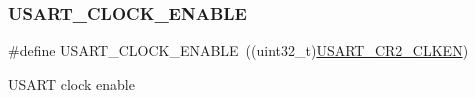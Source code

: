\subsubsection{\texorpdfstring{U\+S\+A\+R\+T\+\_\+\+C\+L\+O\+C\+K\+\_\+\+E\+N\+A\+B\+LE}{USART\_CLOCK\_ENABLE}}
{\footnotesize\ttfamily \#define U\+S\+A\+R\+T\+\_\+\+C\+L\+O\+C\+K\+\_\+\+E\+N\+A\+B\+LE~((uint32\+\_\+t)\hyperlink{group___peripheral___registers___bits___definition_ga42a396cde02ffa0c4d3fd9817b6af853}{U\+S\+A\+R\+T\+\_\+\+C\+R2\+\_\+\+C\+L\+K\+EN})}

U\+S\+A\+RT clock enable 
